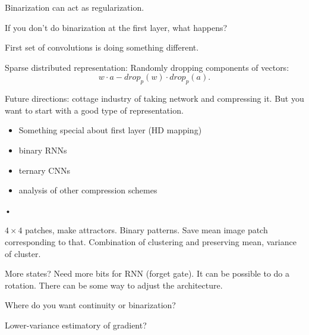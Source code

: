 Binarization can act as regularization.

If you don't do binarization at the first layer, what happens?

First set of convolutions is doing something different.

Sparse distributed representation: Randomly dropping components of vectors:
$$
w \cdot a - drop_p(w)\cdot drop_p(a).
$$

Future directions:
cottage industry of taking network and compressing it. But you want to start with a good type of representation.
\begin{itemize}
\item
Something special about first layer (HD mapping)
\item
binary RNNs
\item
ternary CNNs
\item
analysis of other compression schemes
\end{itemize}•

$4\times 4$ patches, make attractors. Binary patterns. Save mean image patch corresponding to that. Combination of clustering and preserving mean, variance of cluster. 

More states? Need more bits for RNN (forget gate). It can be possible to do a rotation. There can be some way to adjust the architecture. 

Where do you want continuity or binarization? 

Lower-variance estimatory of gradient?


\printbibliography
